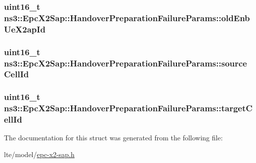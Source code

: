 \subsubsection[{\texorpdfstring{old\+Enb\+Ue\+X2ap\+Id}{oldEnbUeX2apId}}]{\setlength{\rightskip}{0pt plus 5cm}uint16\+\_\+t ns3\+::\+Epc\+X2\+Sap\+::\+Handover\+Preparation\+Failure\+Params\+::old\+Enb\+Ue\+X2ap\+Id}\hypertarget{structns3_1_1EpcX2Sap_1_1HandoverPreparationFailureParams_ab0e0e69bca8943f423ea73a473f559a2}{}\label{structns3_1_1EpcX2Sap_1_1HandoverPreparationFailureParams_ab0e0e69bca8943f423ea73a473f559a2}
\subsubsection[{\texorpdfstring{source\+Cell\+Id}{sourceCellId}}]{\setlength{\rightskip}{0pt plus 5cm}uint16\+\_\+t ns3\+::\+Epc\+X2\+Sap\+::\+Handover\+Preparation\+Failure\+Params\+::source\+Cell\+Id}\hypertarget{structns3_1_1EpcX2Sap_1_1HandoverPreparationFailureParams_af23c597a42726f30008b0c4bdb16c3dc}{}\label{structns3_1_1EpcX2Sap_1_1HandoverPreparationFailureParams_af23c597a42726f30008b0c4bdb16c3dc}
\subsubsection[{\texorpdfstring{target\+Cell\+Id}{targetCellId}}]{\setlength{\rightskip}{0pt plus 5cm}uint16\+\_\+t ns3\+::\+Epc\+X2\+Sap\+::\+Handover\+Preparation\+Failure\+Params\+::target\+Cell\+Id}\hypertarget{structns3_1_1EpcX2Sap_1_1HandoverPreparationFailureParams_a9396b05fdb6d38db8c9e9fd381c45448}{}\label{structns3_1_1EpcX2Sap_1_1HandoverPreparationFailureParams_a9396b05fdb6d38db8c9e9fd381c45448}


The documentation for this struct was generated from the following file\+:\begin{DoxyCompactItemize}
\item 
lte/model/\hyperlink{epc-x2-sap_8h}{epc-\/x2-\/sap.\+h}\end{DoxyCompactItemize}
